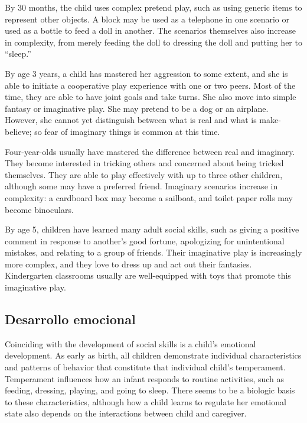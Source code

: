 By 30 months, the child uses complex pretend play, such as using generic items
to represent other objects. A block may be used as a telephone in one scenario
or used as a bottle to feed a doll in another. The scenarios themselves also
increase in complexity, from merely feeding the doll to dressing the doll and
putting her to “sleep.” \cite{Gerber2011}

By age 3 years, a child has mastered her aggression to some extent, and she is
able to initiate a cooperative play experience with one or two peers. Most of
the time, they are able to have joint goals and take turns. She also move into
simple fantasy or imaginative play. She may pretend to be a dog or an airplane.
However, she cannot yet distinguish between what is real and what is
make-believe; so fear of imaginary things is common at this time.
\cite{Gerber2011}

Four-year-olds usually have mastered the difference between real and imaginary.
They become interested in tricking others and concerned about being tricked
themselves. They are able to play effectively with up to three other children,
although some may have a preferred friend. Imaginary scenarios increase in
complexity: a cardboard box may become a sailboat, and toilet paper rolls may
become binoculars. \cite{Gerber2011}

By age 5, children have learned many adult social skills, such as giving a
positive comment in response to another’s good fortune, apologizing for
unintentional mistakes, and relating to a group of friends. Their imaginative
play is increasingly more complex, and they love to dress up and act out their
fantasies. Kindergarten classrooms usually are well-equipped with toys that
promote this imaginative play. \cite{Gerber2011}

\subsection{Desarrollo emocional}
Coinciding with the development of social skills is a child’s emotional
development. As early as birth, all children demonstrate individual
characteristics and patterns of behavior that constitute that individual
child’s temperament. Temperament influences how an infant responds to routine
activities, such as feeding, dressing, playing, and going to sleep. There seems
to be a biologic basis to these characteristics, although how a child learns to
regulate her emotional state also depends on the interactions between child and
caregiver. \cite{Gerber2011}

